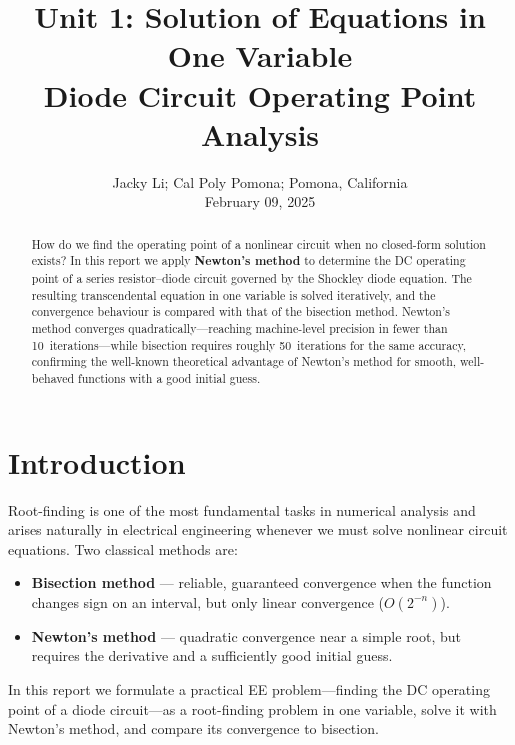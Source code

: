 \documentclass[letterpaper,twocolumn,fleqn]{article}
\title{Unit 1: Solution of Equations in
One Variable \\ Diode Circuit Operating Point Analysis }
\author{ Jacky Li; Cal Poly Pomona; Pomona, California \\ February 09, 2025}
\begin{document}
 
\maketitle 
\thispagestyle{empty} %


\begin{abstract}
How do we find the operating point of a nonlinear circuit when no closed-form
solution exists?  
In this report we apply \textbf{Newton's method} to determine the DC operating
point of a series resistor–diode circuit governed by the Shockley diode
equation.  The resulting transcendental equation in one variable is solved
iteratively, and the convergence behaviour is compared with that of the
bisection method.  Newton's method converges quadratically---reaching
machine-level precision in fewer than 10~iterations---while bisection
requires roughly 50~iterations for the same accuracy, confirming the
well-known theoretical advantage of Newton's method for smooth, well-behaved
functions with a good initial guess.
\end{abstract}


\section{Introduction}

Root-finding is one of the most fundamental tasks in numerical analysis and
arises naturally in electrical engineering whenever we must solve nonlinear
circuit equations.  Two classical methods are:

\begin{itemize}
  \item \textbf{Bisection method} --- reliable, guaranteed convergence when
        the function changes sign on an interval, but only linear convergence
        ($O(2^{-n})$).
  \item \textbf{Newton's method} --- quadratic convergence near a simple root,
        but requires the derivative and a sufficiently good initial guess.
\end{itemize}

In this report we formulate a practical EE problem---finding the DC operating
point of a diode circuit---as a root-finding problem in one variable, solve it
with Newton's method, and compare its convergence to bisection.

\end{document}
